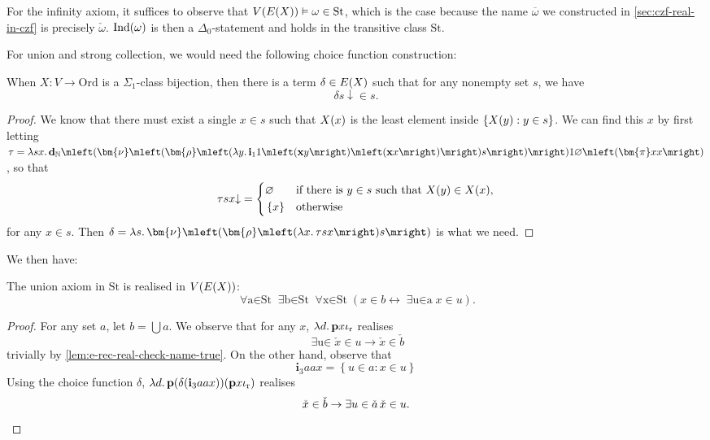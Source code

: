 \documentclass[12pt,openany]{book}
\theoremstyle{plain}
\theoremstyle{definition}
\newcommand\opA[1]{\mathop{\forall #1}}
\newcommand\opE[1]{\mathop{\exists #1}}
\newcommand\oplam[1]{\mathop{\lambda #1.}}
\DeclareMathOperator\Ind{Ind}
\newcommand\CZF{\mathrm{CZF}}
\newcommand\REM{\mathrm{REM}}
\newcommand\Ord{\mathrm{Ord}}
\newcommand\bp{\mathbf{p}}
\newcommand\bdN{\mathbf{d}_\mathbb{N}}
\newcommand\bi{\mathbf{i}}
\newcommand\bx{\mathbf{x}}
\newcommand\ior{\iota_\textup{r}}
\newcommand\St{\mathrm{St}}
\begin{document}
For the infinity axiom, it suffices to observe that $V\mleft(E\mleft(X\mright)\mright) \vDash \omega \in \St$, which is the case because the name $\overline{\omega}$ we constructed in \autoref{sec:czf-real-in-czf} is precisely $\check{\omega}$.
$\Ind\mleft(\omega\mright)$ is then a $\Delta_0$-statement and holds in the transitive class $\St$.

For union and strong collection, we would need the following choice function construction:
\begin{lemma}[$\CZF^- + \REM$]
  \label{lem:e-rec-choice-func}
  When $X : V \rightarrow \Ord$ is a $\Sigma_1$-class bijection, then there is a term $\delta \in E\mleft(X\mright)$ such that for any nonempty set $s$, we have
  \[\delta s {\downarrow} \in s.\]
\end{lemma}

\begin{proof}
  We know that there must exist a single $x \in s$ such that $X\mleft(x\mright)$ is the least element inside $\left\{X\mleft(y\mright) : y \in s\right\}$. We can find this $x$ by first letting $\tau = \oplam{sx} \bdN \mleft(\bm{\nu} \mleft(\bm{\rho} \mleft(\oplam{y} \bi_1 1 \mleft(\bx y\mright) \mleft(\bx x\mright)\mright) s\mright)\mright) 1 \varnothing \mleft(\bm{\pi} xx\mright)$, so that
  \[\tau sx {\downarrow} = \left\{\begin{aligned}
       & \varnothing      &  & \text{if there is $y \in s$ such that $X\mleft(y\mright) \in X\mleft(x\mright)$}, \\
       & \left\{x\right\} &  & \text{otherwise}
    \end{aligned}\right.\]
  for any $x \in s$. Then $\delta = \oplam{s} \bm{\nu} \mleft(\bm{\rho} \mleft(\oplam{x} \tau sx\mright) s\mright)$ is what we need.
\end{proof}

We then have:
\begin{lemma}
  The union axiom in $\St$ is realised in $V\mleft(E\mleft(X\mright)\mright)$:
  \[\opA{a \in \St} \opE{b \in \St} \opA{x \in \St} \left(x \in b \leftrightarrow \opE{u \in a} x \in u\right).\]
\end{lemma}

\begin{proof}
  For any set $a$, let $b = \bigcup a$. We observe that for any $x$, $\oplam{d} \bp x \ior$ realises
  \[\opE{u \in \check{a}} \check{x} \in u \rightarrow \check{x} \in \check{b}\]
  trivially by \autoref{lem:e-rec-real-check-name-true}. On the other hand, observe that
  \[\bi_3 aax = \left\{u \in a : x \in u\right\}\]
  Using the choice function $\delta$, $\oplam{d} \bp \mleft(\delta \mleft(\bi_3 aax\mright)\mright) \mleft(\bp x \ior\mright)$ realises
  \[\check{x} \in \check{b} \rightarrow \opE{u \in \check{a}} \check{x} \in u. \qedhere\]
\end{proof}
\end{document}
